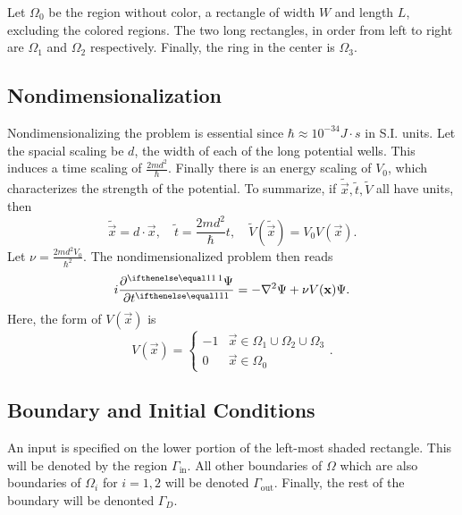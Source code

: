 \documentclass[../../main.tex]{subfiles}
\begin{document}
Let $\Omega_0$ be the region without color, a rectangle of width 
$W$ and length $L$, excluding the colored regions.
The two long rectangles, in order from left to right are $\Omega_1$ and 
$\Omega_2$ respectively.  Finally, the ring in the center is 
$\Omega_3$.



\subsection{Nondimensionalization}

Nondimensionalizing the problem is essential since 
$\hbar \approx 10^{-34} J \cdot s$ in S.I. units.  
Let the spacial scaling be $d$, the width of each of the long potential 
wells.  
This induces a time scaling of 
$\frac{2m d^2}{\hbar}$.  
Finally there is an energy scaling of $V_0$, which characterizes the 
strength of the potential.
To summarize, 
if $\tilde{\vec x}, \tilde t, \tilde V$ all have units, then
\begin{equation}
		\label{eq:nd}
		\tilde{\vec x} = d \cdot \vec x, \quad 
		\tilde t = \frac{2m d^2}{\hbar} t, \quad 
		\tilde V(\tilde{\vec x}) = V_0 V(\vec x)
.\end{equation}
Let $\nu = \frac{2md^2 V_0}{\hbar^2}$.  
The nondimensionalized problem then reads
\begin{equation}
		\label{eq:schrodinger-nondim}
		i \pder{\Psi}{t} = -\nabla^2 \Psi + \nu V(\vec x) \Psi
.\end{equation}
Here, the form of $V(\vec x)$ is 
\begin{equation}
		\label{eq:potential-nondim}
		V(\vec x) = 
		\begin{cases}
				-1 & \vec x \in \Omega_1 \cup \Omega_2 \cup \Omega_3 \\
				0 & \vec x \in \Omega_0
		\end{cases}
.\end{equation}

\subsection{Boundary and Initial Conditions}

An input is specified on the lower portion of the left-most 
shaded rectangle.  
This will be denoted by the region $\Gamma_\mathrm{in}$.  
All other boundaries of $\Omega$ which are also boundaries of 
$\Omega_i$ for $i = 1, 2$ will be denoted 
$\Gamma_\mathrm{out}$.  
Finally, the rest of the boundary will be denonted $\Gamma_D$.  
\end{document}
